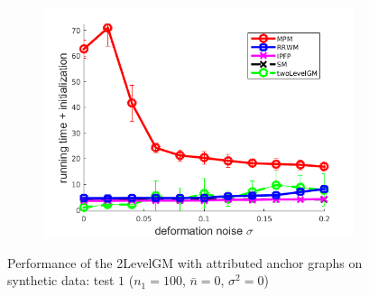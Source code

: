\begin{figure}[h]
\begin{subfigure}[b]{0.31\textwidth}
		\includegraphics[scale=0.25]{"chapter3/fig/SyntheticTest/descr/Results_v4.3.3/Test2/time_summary_avg10t"} 
	\end{subfigure} 
	\caption[Performance of the 2LevelGM with attributed anchor graphs on synthetic data (test $1$)]{Performance of the 2LevelGM with attributed anchor graphs on synthetic data: test $1$ ($n_1=100$, $\bar{n}=0$, $\sigma^2=0$)}
	\label{fig:synTest1_descr_ver433}
\end{figure}
